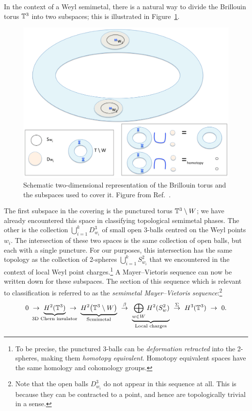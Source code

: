 In the context of a Weyl semimetal, there is a natural way to divide the Brillouin torus $\mathbb{T}^3$ into two subspaces; this is illustrated in Figure~\ref{fig:semimetal-MV}.
\begin{figure}[htb!]
	\centering
	\includegraphics[width=.8\linewidth]{Images/semimetal-MV}
	\caption{
		Schematic two-dimensional representation of the Brillouin torus and the subspaces used to cover it.
		Figure from Ref.~\cite{Thiang_equivariant}.}
	\label{fig:semimetal-MV}
\end{figure}
The first subspace in the covering is the punctured torus $\mathbb{T}^3\setminus W$; we have already encountered this space in classifying topological semimetal phases. The other is the collection $\bigcup_{i=1}^k D_{w_i}^3$ of small open 3-balls centred on the Weyl points $w_i$. The intersection of these two spaces is the same collection of open balls, but each with a single puncture. For our purposes, this intersection has the same topology as the collection of 2-spheres $\bigcup_{i=1}^k S_{w_i}^2$ that we encountered in the context of local Weyl point charges.\footnote{
	To be precise, the punctured 3-balls can be \emph{deformation retracted} into the 2-spheres, making them \emph{homotopy equivalent}. Homotopy equivalent spaces have the same homology and cohomology groups.}
A Mayer--Vietoris sequence can now be written down for these subspaces. The section of this sequence which is relevant to classification is referred to as the \emph{semimetal Mayer--Vietoris sequence}:\footnote{
	Note that the open balls $D_{w_i}^3$ do not appear in this sequence at all. This is because they can be contracted to a point, and hence are topologically trivial in a sense.}
\begin{equation}\label{eq:semimetal-MV-symbolic}
	0\ \to\ \underbrace{H^2(\T^3)}_{\mathclap{\text{3D Chern insulator}}}\ \to\ 
	\underbrace{H^2\big(\T^3\setminus W\big)}_{\text{Semimetal}}\ \overset{\beta}{\to}\ \underbrace{\bigoplus_{w\in W} H^2(S_w^2)}_{\text{Local charges}}\ \overset{\Sigma}{\to}\ H^3(\T^3)\ \to\ 0.
\end{equation}
